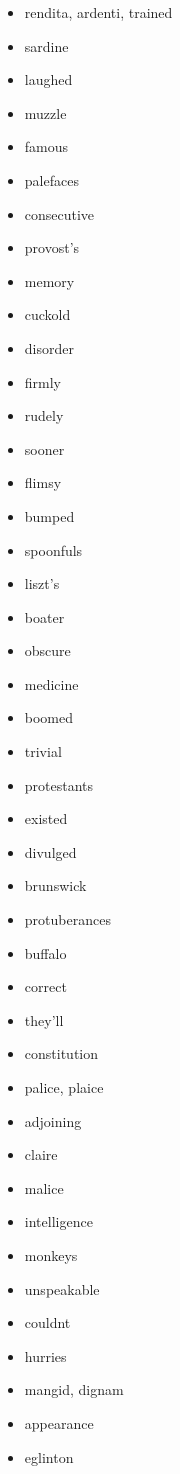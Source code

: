 \documentclass{article}
\begin{document}
\begin{itemize}
    \item rendita, ardenti, trained
    \item sardine
    \item laughed
    \item muzzle
    \item famous
    \item palefaces
    \item consecutive
    \item provost's
    \item memory
    \item cuckold
    \item disorder
    \item firmly
    \item rudely
    \item sooner
    \item flimsy
    \item bumped
    \item spoonfuls
    \item liszt's
    \item boater
    \item obscure
    \item medicine
    \item boomed
    \item trivial
    \item protestants
    \item existed
    \item divulged
    \item brunswick
    \item protuberances
    \item buffalo
    \item correct
    \item they'll
    \item constitution
    \item palice, plaice
    \item adjoining
    \item claire
    \item malice
    \item intelligence
    \item monkeys
    \item unspeakable
    \item couldnt
    \item hurries
    \item mangid, dignam
    \item appearance
    \item eglinton

\end{itemize}
\end{document}
